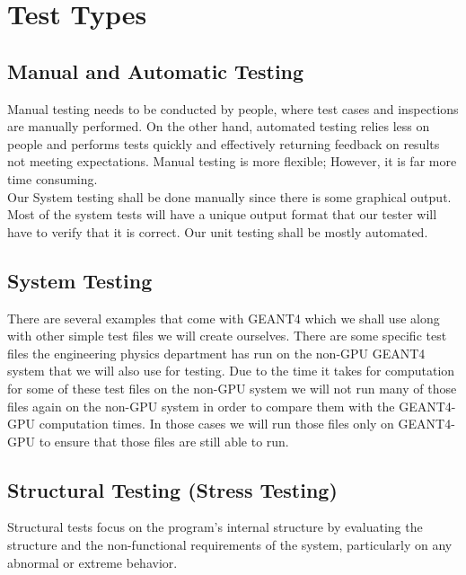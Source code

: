 \documentclass[12pt]{article}
\begin{document}
\section{Test Types}

\subsection{Manual and Automatic Testing} %
Manual testing needs to be conducted by people, where test cases and inspections are manually performed. On the other hand, automated testing relies less on people and performs tests quickly and effectively returning feedback on results not meeting expectations. Manual testing is more flexible; However, it is far more time consuming.\\

Our System testing shall be done manually since there is some graphical output. Most of the system tests will have a unique output format that our tester will have to verify that it is correct. Our unit testing shall be mostly automated.\\ 

\subsection{System Testing} %
There are several examples that come with GEANT4 which we shall use along with other simple test files we will create ourselves. There are some specific test files the engineering physics department has run on the non-GPU GEANT4 system that we will also use for testing. Due to the time it takes for computation for some of these test files on the non-GPU system we will not run many of those files again on the non-GPU system in order to compare them with the GEANT4-GPU computation times. In those cases we will run those files only on GEANT4-GPU to ensure that those files are still able to run.

\subsection{Structural Testing (Stress Testing)} %
Structural tests focus on the program's internal structure by evaluating the structure and the non-functional requirements of the system, particularly on any abnormal or extreme behavior.\\ 
\end{document}

